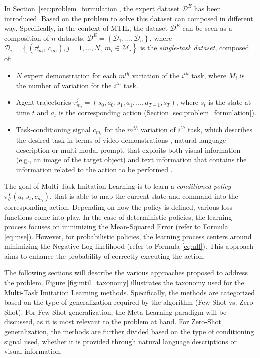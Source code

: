 In Section~\ref{sec:problem_formulation}, the expert dataset $\mathcal{D}^{E}$ has been introduced. Based on the problem to solve this dataset can composed in different way. Specifically, in the context of MTIL, the dataset $\mathcal{D}^{E}$ can be seen as a composition of $n$ datasets, $\mathcal{D}^{E}=\left \{\mathcal{D}_{1}, \dots, \mathcal{D}_{n}\right \}$, where $\mathcal{D}_{i} = \left \{ (\tau_{m_{i}}^{j}, \ c_{m_{i}}), j=1,\dots,N, \ m_{i} \in \mathcal{M}_{i}\right \}$ is the \textit{single-task dataset}, composed of:
\begin{itemize}
    \item $N$ expert demonstration for each $m^{th}$ variation of the $i^{th}$ task, where $M_{i}$ is the number of variation for the $i^{th}$ task.
    \item Agent trajectories $\tau_{m_{i}}^{j} = (s_{0}, a_{0}, s_{1}, a_{1}, \dots, a_{T-1}, s_{T})$, where $s_{t}$ is the state at time $t$ and $a_{t}$ is the corresponding action (Section \ref{sec:problem_formulation}).
    \item Task-conditioning signal $c_{m_{i}}$ for the $m^{th}$ variation of $i^{th}$ task, which describes the desired task in terms of video demonstrations \cite{james2018task_embedded,bhutani2022attentive_one_shot,dasari2021transformers_one_shot,mandi2022towards_more_generalizable_one_shot}, natural language description \cite{stepputtis2020language,jang2022bc_z,mees2022calvin,doasIcan2022,mees2022hulc,brohan2022rt,shridhar2023perceiver} or multi-modal prompt, that exploits both visual information (e.g., an image of the target object) and text information that contains the information related to the action to be performed \cite{jiang2023vima}.
\end{itemize}
The goal of Multi-Task Imitation Learning is to learn a \textit{conditioned policy} $\pi^{L}_{\theta}(a_{t}|s_{t}, c_{m_{i}})$, that is able to map the current state and command into the corresponding action.
Depending on how the policy is defined, various loss functions come into play. In the case of deterministic policies, the learning process focuses on minimizing the Mean-Squared Error (refer to Formula \ref{eq:mse}). However, for probabilistic policies, the learning process centers around minimizing the Negative Log-likelihood (refer to Formula \ref{eq:nll}). This approach aims to enhance the probability of correctly executing the action.

The following sections will describe the various approaches proposed to address the problem. Figure \ref{fig:mtil_taxonomy} illustrates the taxonomy used for the Multi-Task Imitation Learning methods. Specifically, the methods are categorized based on the type of generalization required by the algorithm (Few-Shot vs. Zero-Shot). For Few-Shot generalization, the Meta-Learning paradigm will be discussed, as it is most relevant to the problem at hand. For Zero-Shot generalization, the methods are further divided based on the type of conditioning signal used, whether it is provided through natural language descriptions or visual information.


